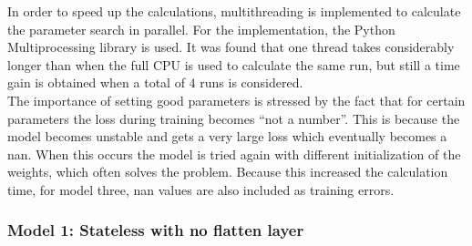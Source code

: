 In order to speed up the calculations, multithreading is implemented to calculate the parameter search in parallel. For the implementation, the Python Multiprocessing library is used. It was found that one thread takes considerably longer than when the full CPU is used to calculate the same run, but still a time gain is obtained when a total of $ 4 $ runs is considered.\\

The importance of setting good parameters is stressed by the fact that for certain parameters the loss during training becomes ``not a number''. This is because the model becomes unstable and gets a very large loss which eventually becomes a nan. When this occurs the model is tried again with different initialization of the weights, which often solves the problem. Because this increased the calculation time, for model three, nan values are also included as training errors.


\subsubsection{Model 1: Stateless with no flatten layer}

